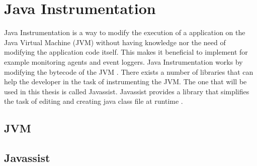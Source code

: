 \section{Java Instrumentation}
Java Instrumentation is a way to modify the execution of a application on the Java Virtual Machine (JVM) without having knowledge nor the need of modifying the application code itself. This makes it beneficial to implement for example monitoring agents and event loggers. Java Instrumentation works by modifying the bytecode of the JVM \parencite{Java_Instrument}. There exists a number of libraries that can help the developer in the task of instrumenting the JVM. The one that will be used in this thesis is called Javassist. Javassist provides a library that simplifies the task of editing and creating java class file at runtime \parencite{Javassist}.

\subsection{JVM}
\subsection{Javassist}
